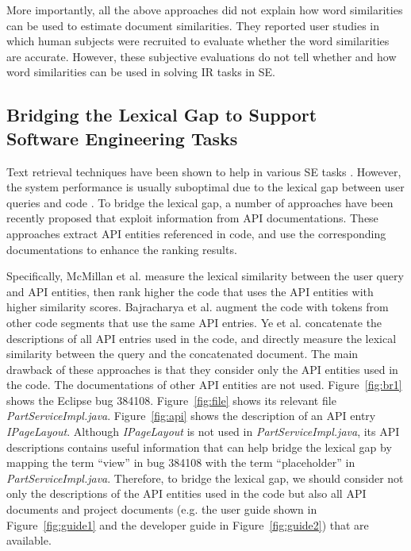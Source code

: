 More importantly, all the above approaches did not explain how word similarities can be used to estimate document similarities. They reported user studies in which human subjects were recruited to evaluate whether the word similarities are accurate. However, these subjective evaluations do not tell whether and how word similarities can be used in solving IR tasks in SE.

\subsection{Bridging the Lexical Gap to Support \\Software Engineering Tasks}

Text retrieval techniques have been shown to help in various SE tasks \cite{Haiduc:2013:AQR:2486788.2486898, marcus2012use}. However, the system performance is usually suboptimal due to the lexical gap between user queries and code \cite{5989838}. To bridge the lexical gap, a number of approaches \cite{Bajracharya:2010:LUS:1882291.1882316, Chatterjee:2009:SSE:1533013.1533048, Dasgupta:2013:EST:2550526.2550586, 5989838, Stylos:2006:MWT:1174509.1174678, ye:fse14} have been recently proposed that exploit information from API documentations. These approaches extract API entities referenced in code, and use the corresponding documentations to enhance the ranking results.

Specifically, McMillan et al. \cite{5989838} measure the lexical similarity between the user query and API entities, then rank higher the code that uses the API entities with higher similarity scores. Bajracharya et al. \cite{Bajracharya:2010:LUS:1882291.1882316} augment the code with tokens from other code segments that use the same API entries. Ye et al. \cite{ye:fse14} concatenate the descriptions of all API entries used in the code, and directly measure the lexical similarity between the query and the concatenated document. The main drawback of these approaches is that they consider only the API entities used in the code. The documentations of other API entities are not used. Figure~\ref{fig:br1} shows the Eclipse bug 384108. Figure~\ref{fig:file} shows its relevant file {\it PartServiceImpl.java}. Figure~\ref{fig:api} shows the description of an API entry {\it IPageLayout}. Although {\it IPageLayout} is not used in {\it PartServiceImpl.java}, its API descriptions contains useful information that can help bridge the lexical gap by mapping the term ``view'' in bug 384108 with the term ``placeholder'' in {\it PartServiceImpl.java}. Therefore, to bridge the lexical gap, we should consider not only the descriptions of the API entities used in the code but also all API documents and project documents (e.g. the user guide shown in Figure~\ref{fig:guide1} and the developer guide in Figure~\ref{fig:guide2}) that are available.

